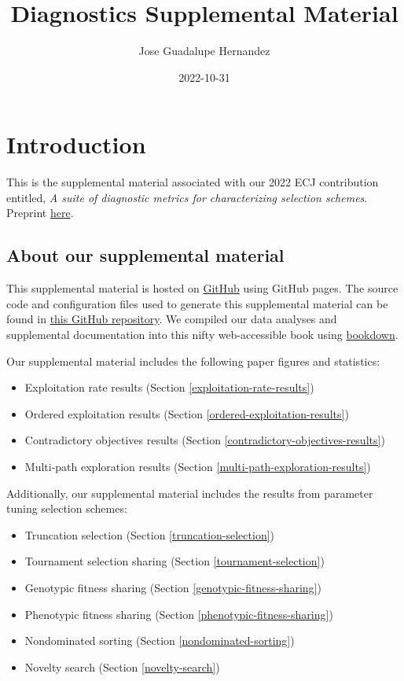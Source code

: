 \documentclass[]{book}
\title{Diagnostics Supplemental Material}
\author{Jose Guadalupe Hernandez}
\date{2022-10-31}
\providecommand{\tightlist}{%
  \setlength{\itemsep}{0pt}\setlength{\parskip}{0pt}}
\begin{document}
\maketitle

{
\setcounter{tocdepth}{1}
\tableofcontents
}
\hypertarget{introduction}{%
\chapter{Introduction}\label{introduction}}

This is the supplemental material associated with our 2022 ECJ contribution entitled, \emph{A suite of diagnostic metrics for characterizing selection schemes}.
Preprint \href{https://arxiv.org/pdf/2204.13839.pdf}{here}.

\hypertarget{about-our-supplemental-material}{%
\section{About our supplemental material}\label{about-our-supplemental-material}}

This supplemental material is hosted on \href{https://github.com}{GitHub} using GitHub pages.
The source code and configuration files used to generate this supplemental material can be found in \href{https://github.com/jgh9094/ECJ-2022-suite-of-diagnostics-for-selection-schemes}{this GitHub repository}.
We compiled our data analyses and supplemental documentation into this nifty web-accessible book using \href{https://bookdown.org/}{bookdown}.

Our supplemental material includes the following paper figures and statistics:

\begin{itemize}
\tightlist
\item
  Exploitation rate results (Section \ref{exploitation-rate-results})
\item
  Ordered exploitation results (Section \ref{ordered-exploitation-results})
\item
  Contradictory objectives results (Section \ref{contradictory-objectives-results})
\item
  Multi-path exploration results (Section \ref{multi-path-exploration-results})
\end{itemize}

Additionally, our supplemental material includes the results from parameter tuning selection schemes:

\begin{itemize}
\tightlist
\item
  Truncation selection (Section \ref{truncation-selection})
\item
  Tournament selection sharing (Section \ref{tournament-selection})
\item
  Genotypic fitness sharing (Section \ref{genotypic-fitness-sharing})
\item
  Phenotypic fitness sharing (Section \ref{phenotypic-fitness-sharing})
\item
  Nondominated sorting (Section \ref{nondominated-sorting})
\item
  Novelty search (Section \ref{novelty-search})
\end{itemize}
\end{document}
